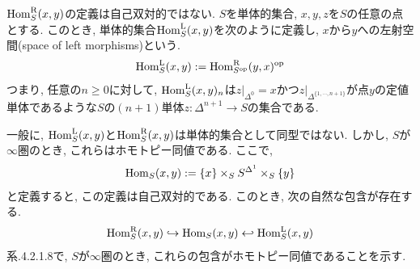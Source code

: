 \documentclass[uplatex, a4paper, 14Q, dvipdfmx]{jsreport}
\begin{document}
\begin{remark} \label{rem.1.2.2.5}
  $\mathrm{Hom}^{\mathrm{R}}_S(x,y)$の定義は自己双対的ではない. 
  $S$を単体的集合, $x,y,z$を$S$の任意の点とする. 
  このとき, 単体的集合$\mathrm{Hom}^{\mathrm{L}}_S(x,y)$を次のように定義し, $x$から$y$への左射空間(space of left morphisms)という. 
  \begin{align*}
    \mathrm{Hom}^{\mathrm{L}}_S(x,y) := \mathrm{Hom}^{\mathrm{R}}_{S^{\mathrm{op}}}(y,x)^{\mathrm{op}}
  \end{align*}
  つまり, 任意の$n \geq 0$に対して, $\mathrm{Hom}^{\mathrm{L}}_S(x,y)_n$は$z|_{\Delta^{0}} = x$かつ$z|_{\Delta^{\{1,\cdots,n+1\}}}$が点$y$の定値単体であるような$S$の$(n+1)$単体$z : \Delta^{n+1} \to S$の集合である. 
\end{remark}

一般に, $\mathrm{Hom}^{\mathrm{L}}_S(x,y)$と$\mathrm{Hom}^{\mathrm{R}}_S(x,y)$は単体的集合として同型ではない.
しかし, $S$が$\infty$圏のとき, これらはホモトピー同値である. 
ここで, 
\begin{align*}
  \mathrm{Hom}_S(x,y) := \{x\} \times_{S} S^{\Delta^1} \times_S \{y\}
\end{align*}
と定義すると, この定義は自己双対的である. 
このとき, 次の自然な包含が存在する. 
\begin{align*}
  \mathrm{Hom}^{\mathrm{R}}_S(x,y) \hookrightarrow \mathrm{Hom}_S(x,y) \hookleftarrow \mathrm{Hom}^{\mathrm{L}}_S(x,y)
\end{align*}
系.4.2.1.8で, $S$が$\infty$圏のとき, これらの包含がホモトピー同値であることを示す. 
\end{document}
